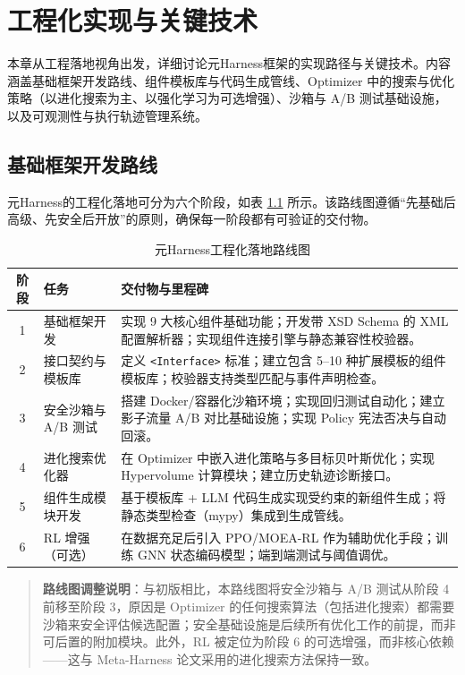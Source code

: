 \chapter{工程化实现与关键技术}

本章从工程落地视角出发，详细讨论元Harness框架的实现路径与关键技术。内容涵盖基础框架开发路线、组件模板库与代码生成管线、Optimizer 中的搜索与优化策略（以进化搜索为主、以强化学习为可选增强）、沙箱与 A/B 测试基础设施，以及可观测性与执行轨迹管理系统。

\section{基础框架开发路线}

元Harness的工程化落地可分为六个阶段，如表 \ref{tab:roadmap} 所示。该路线图遵循“先基础后高级、先安全后开放”的原则，确保每一阶段都有可验证的交付物。

\begin{table}[htbp]
\centering
\caption{元Harness工程化落地路线图}
\label{tab:roadmap}
\begin{tabular}{@{}clp{8cm}@{}}
\toprule
\textbf{阶段} & \textbf{任务} & \textbf{交付物与里程碑} \\
\midrule
1 & 基础框架开发 & 实现 9 大核心组件基础功能；开发带 XSD Schema 的 XML 配置解析器；实现组件连接引擎与静态兼容性校验器。 \\
2 & 接口契约与模板库 & 定义 \texttt{<Interface>} 标准；建立包含 5--10 种扩展模板的组件模板库；校验器支持类型匹配与事件声明检查。 \\
3 & 安全沙箱与 A/B 测试 & 搭建 Docker/容器化沙箱环境；实现回归测试自动化；建立影子流量 A/B 对比基础设施；实现 Policy 宪法否决与自动回滚。 \\
4 & 进化搜索优化器 & 在 Optimizer 中嵌入进化策略与多目标贝叶斯优化；实现 Hypervolume 计算模块；建立历史轨迹诊断接口。 \\
5 & 组件生成模块开发 & 基于模板库 + LLM 代码生成实现受约束的新组件生成；将静态类型检查（mypy）集成到生成管线。 \\
6 & RL 增强（可选） & 在数据充足后引入 PPO/MOEA-RL 作为辅助优化手段；训练 GNN 状态编码模型；端到端测试与阈值调优。 \\
\bottomrule
\end{tabular}
\end{table}

\begin{quote}
\textbf{路线图调整说明}：与初版相比，本路线图将安全沙箱与 A/B 测试从阶段 4 前移至阶段 3，原因是 Optimizer 的任何搜索算法（包括进化搜索）都需要沙箱来安全评估候选配置；安全基础设施是后续所有优化工作的前提，而非可后置的附加模块。此外，RL 被定位为阶段 6 的可选增强，而非核心依赖——这与 Meta-Harness 论文采用的进化搜索方法保持一致。
\end{quote}


